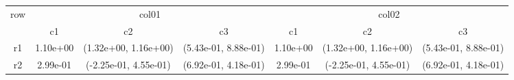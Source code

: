 \begin{tabular}{ccccccc}
\toprule
\multirow{2}{*}{row}&\multicolumn{3}{c}{col01}&\multicolumn{3}{c}{col02}\tabularnewline
\cmidrule(lr){2-4}
\cmidrule(lr){5-7}
&c1&c2&c3&c1&c2&c3\tabularnewline
\midrule
r1&1.10e+00& (1.32e+00, 1.16e+00)& (5.43e-01, 8.88e-01)&1.10e+00& (1.32e+00, 1.16e+00)& (5.43e-01, 8.88e-01)\tabularnewline
r2&2.99e-01& (-2.25e-01, 4.55e-01)& (6.92e-01, 4.18e-01)&2.99e-01& (-2.25e-01, 4.55e-01)& (6.92e-01, 4.18e-01)\tabularnewline
\bottomrule
\end{tabular}
